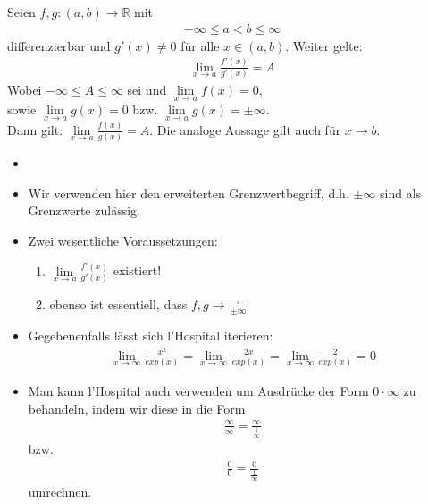 \begin{Satz}{
	Seien $f,g: (a,b) \rightarrow \mathbb{R}$ mit
	\begin{align*}
		-\infty \leq a < b \leq \infty
	\end{align*}		
	differenzierbar und $g'(x) \neq 0$ für alle $x \in (a,b)$. Weiter gelte:
	\begin{align*}
		\lim\limits_{x \rightarrow a}{\frac{f'(x)}{g'(x)} } = A
	\end{align*}
	Wobei  $ -\infty \leq A \leq \infty$ sei und 
	$\lim\limits_{x \rightarrow a}{f(x) = 0}$, \\ 
	sowie 
	$\lim\limits_{x \rightarrow a}{g(x) = 0} $
	bzw. $\lim\limits_{x\rightarrow a}{g(x) = \pm \infty}$.\\
	Dann gilt: $\lim\limits_{x \rightarrow a}{\frac{f(x)}{g(x)} = A}$.
	Die analoge Aussage gilt auch für $x \rightarrow b$.
}\end{Satz}

\begin{Bemerkung}{
	\begin{itemize}
		\item[ ]
		\item Wir verwenden hier den erweiterten Grenzwertbegriff, d.h. $\pm \infty$ 
		sind als Grenzwerte zulässig.
		\item Zwei wesentliche Voraussetzungen:
			\begin{enumerate}
				\item $\lim\limits_{x \rightarrow a}
				{\frac{f'(x)}{g'(x)}}$ existiert!
				\item ebenso ist essentiell, dass $f,g \rightarrow 
				\frac{\circ }{\pm \infty}$
			\end{enumerate}
		\item Gegebenenfalls lässt sich l'Hospital iterieren:
		\begin{align*}
			\lim\limits_{x \rightarrow \infty}{\frac{x^2}{exp(x)}} = 
			\lim\limits_{x \rightarrow \infty}{\frac{2x}{exp(x)}} = 
			\lim\limits_{x \rightarrow \infty}{\frac{2}{exp(x)}} = 0
		\end{align*}
		\item Man kann l'Hospital auch verwenden um Ausdrücke der Form 
		$0 \cdot \infty$ zu behandeln, indem wir diese in die Form
		\begin{align*}
		 	\frac{\infty}{\infty} = \frac{\infty}{\frac{1}{\infty}}
		\end{align*}
		bzw. 
		\begin{align*}
			\frac{0}{0} = \frac{0}{\frac{1}{\infty}}
		\end{align*}
		umrechnen.
	\end{itemize}
}\end{Bemerkung}
	
